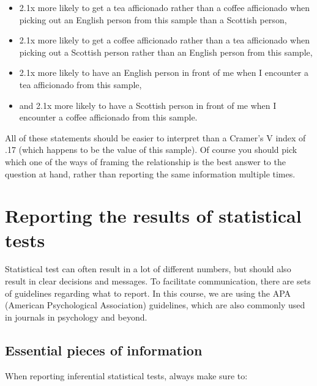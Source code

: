 \documentclass[
]{book}
\providecommand{\tightlist}{%
  \setlength{\itemsep}{0pt}\setlength{\parskip}{0pt}}
\begin{document}
\begin{itemize}
\tightlist
\item
  2.1x more likely to get a tea afficionado rather than a coffee afficionado when picking out an English person from this sample than a Scottish person,
\item
  2.1x more likely to get a coffee afficionado rather than a tea afficionado when picking out a Scottish person rather than an English person from this sample,
\item
  2.1x more likely to have an English person in front of me when I encounter a tea afficionado from this sample,
\item
  and 2.1x more likely to have a Scottish person in front of me when I encounter a coffee afficionado from this sample.
\end{itemize}

All of these statements should be easier to interpret than a Cramer's V index of .17 (which happens to be the value of this sample). Of course you should pick which one of the ways of framing the relationship is the best answer to the question at hand, rather than reporting the same information multiple times.

\hypertarget{reporting-the-results-of-statistical-tests}{%
\chapter{Reporting the results of statistical tests}\label{reporting-the-results-of-statistical-tests}}

Statistical test can often result in a lot of different numbers, but should also result in clear decisions and messages. To facilitate communication, there are sets of guidelines regarding what to report. In this course, we are using the APA (American Psychological Association) guidelines, which are also commonly used in journals in psychology and beyond.

\hypertarget{essential-pieces-of-information}{%
\section{Essential pieces of information}\label{essential-pieces-of-information}}

When reporting inferential statistical tests, always make sure to:
\end{document}
